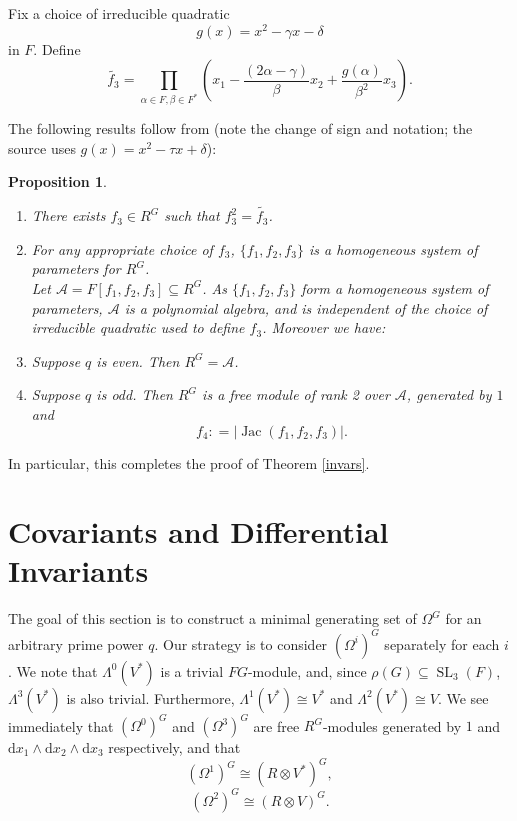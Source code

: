 \documentclass[a4paper]{amsart}
\newcommand{\dd}{\mathrm{d}}
\def\SL{\operatorname{SL}}
\def\Jac{\operatorname{Jac}}
\newtheorem{prop}[Lemma]{Proposition}
\newtheorem*{Corollary of Conjecture}{Corollary of Conjecture}
\theoremstyle{definition}
\theoremstyle{remark}
\theoremstyle{Acknowledgments}
\begin{document}
Fix a choice of irreducible quadratic \begin{equation}\label{g}g (x) = x^2 - \gamma x - \delta\end{equation} in $F$. Define
\[\tilde{f_3} = \prod_{\alpha \in F, \beta \in F^*} \left(x_1 - \frac{(2\alpha-\gamma)}{\beta}x_2 + \frac{g(\alpha)}{\beta^2} x_3 \right).\]

The following results follow from \cite[Section~7, 8]{Maithani} (note the change of sign and notation; the source uses $g(x)=x^2-\tau x+\delta$):
\begin{prop}\label{preinv}\
\begin{enumerate}
\item[(a)] There exists $f_3 \in R^G$ such that $f_3^2 = \tilde{f_3}$.

\item[(b)] For any appropriate choice of $f_3$, $\{f_1,f_2,f_3\}$ is a homogeneous system of parameters for $R^G$. \\

Let $\mathcal{A} = F[f_1,f_2,f_3] \subseteq R^G$. As $\{f_1,f_2,f_3\}$ form a homogeneous system of parameters, $\mathcal{A}$ is a polynomial algebra, and is independent of the choice of irreducible quadratic used to define $f_3$. Moreover we have:\\

\item[(c)] Suppose $q$ is even. Then $R^G = \mathcal{A}$.

\item[(d)] Suppose $q$ is odd. Then $R^G$ is a free module of rank 2 over $\mathcal{A}$, generated by $1$ and
\[f_4: =| \Jac(f_1,f_2,f_3)|.\]
\end{enumerate}
\end{prop}
In particular, this completes the proof of Theorem \ref{invars}.


\section{Covariants and Differential Invariants}

The goal of this section is to construct a minimal generating set of $\Omega^G$ for an arbitrary prime power $q$. Our strategy is to consider $(\Omega^i)^G$ separately for each $i$. We note that $\Lambda^0(V^*)$ is a trivial $FG$-module, and, since $\rho(G) \subseteq \SL_3(F)$, $\Lambda^3(V^*)$ is also trivial. Furthermore, $\Lambda^1(V^*) \cong V^*$ and $\Lambda^2(V^*) \cong V$. We see immediately that $(\Omega^0)^G$ and $(\Omega^3)^G$ are free $R^G$-modules generated by $1$ and $\dd x_1 \wedge \dd x_2 \wedge \dd x_3$ respectively, and that
\[(\Omega^1)^G \cong (R \otimes V^*)^G,\]
\[(\Omega^2)^G \cong (R \otimes V)^G.\]
\end{document}
